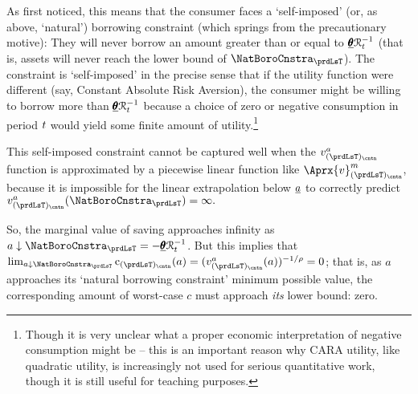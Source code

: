 As \cite{zeldesStochastic} first noticed, this means that the consumer faces a `self-imposed' (or, as above, `natural') borrowing constraint (which springs from the precautionary motive): They will never borrow an amount greater than or equal to $\underline{\pmb{\theta}}\mathcal{R}_{t}^{-1}$ (that is, assets will never reach the lower bound of $\NatBoroCnstra_{\prdLsT}$).  The constraint is `self-imposed' in the precise sense that if the utility function were different (say, Constant Absolute Risk Aversion), the consumer might be willing to borrow more than $\underline{\pmb{\theta}}\mathcal{R}_{t}^{-1}$ because a choice of zero or negative consumption in period $t$ would yield some finite amount of utility.\footnote{Though it is very unclear what a proper economic interpretation of negative consumption might be -- this is an important reason why CARA utility, like quadratic utility, is increasingly not used for serious quantitative work, though it is still useful for teaching purposes.}

This self-imposed constraint cannot be captured well when the $\vFunc^{{a}}_{({\prdLsT})_\cntn}$ function is approximated by a piecewise linear function like $\Aprx{\vFunc}^{{m}}_{({\prdLsT})_\cntn}$, because it is impossible for the linear extrapolation below ${\underline{a}}$ to correctly predict $\vFunc^{{a}}_{({\prdLsT})_\cntn}(\NatBoroCnstra_{\prdLsT})=\infty.$ %


So, the marginal value of saving approaches infinity as $\aNrm \downarrow \NatBoroCnstra_{\prdLsT}=-\underline{\TranShkEmp}\RNrm_{\prdT}^{-1}$.  But this implies that $\lim_{\aNrm \downarrow \NatBoroCnstra_{\prdLsT}} \cFunc_{({\prdLsT})_\cntn}(\aNrm) = (\vFunc^{{a}}_{({\prdLsT})_\cntn}(\aNrm))^{-1/\CRRA} = 0$; that is, as ${a}$ approaches its `natural borrowing constraint' minimum possible value, the corresponding amount of worst-case ${c}$ must approach \textit{its} lower bound: zero.

